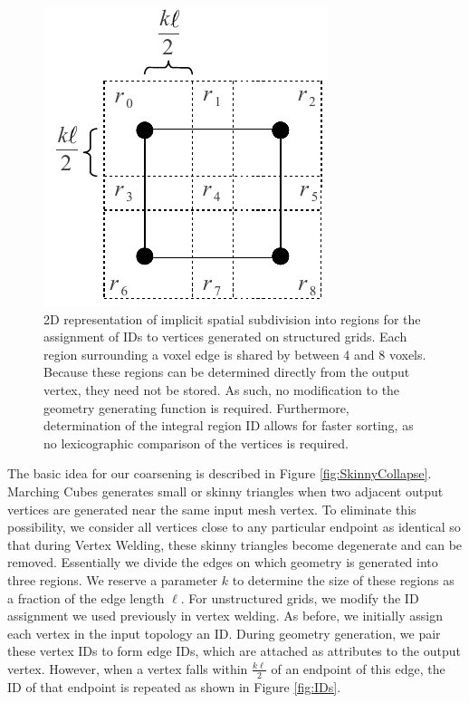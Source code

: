\documentclass[journal]{vgtc}                %
\begin{document}
\begin{figure}[!ht]
\begin{center}
\includegraphics[height=0.5\columnwidth]{Subdivision}
\caption{2D representation of implicit spatial subdivision into regions for the assignment of IDs to vertices generated on structured grids. Each region surrounding a voxel edge is shared by between 4 and 8 voxels. Because these regions can be determined directly from the output vertex, they need not be stored. As such, no modification to the geometry generating function is required. Furthermore, determination of the integral region ID allows for faster sorting, as no lexicographic comparison of the vertices is required.}
\label{fig:Subdivision}
\end{center}
\end{figure}

The basic idea for our coarsening is described in Figure \ref{fig:SkinnyCollapse}. Marching Cubes generates small or skinny triangles when two adjacent output vertices are generated near the same input mesh vertex. To eliminate this possibility, we consider all vertices close to any particular endpoint as identical so that during Vertex Welding, these skinny triangles become degenerate and can be removed. Essentially we divide the edges on which geometry is generated into three regions. We reserve a parameter $k$ to determine the size of these regions as a fraction of the edge length $\ell$. For unstructured grids, we modify the ID assignment we used previously in vertex welding. As before, we initially assign each vertex in the input topology an ID. During geometry generation, we pair these vertex IDs to form edge IDs, which are attached as attributes to the output vertex. However, when a vertex falls within $\frac{k\ell}{2}$ of an endpoint of this edge, the ID of that endpoint is repeated as shown in Figure \ref{fig:IDs}.
\end{document}
